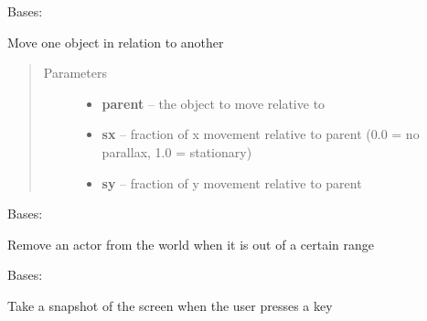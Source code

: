 \documentclass[letterpaper,10pt,english]{sphinxmanual}
\begin{document}
\begin{fulllineitems}
\label{blocks:serge.blocks.behaviours.ParallaxMotion}
Bases: {\hyperref[blocks:serge.blocks.behaviours.Behaviour]{}}

Move one object in relation to another
\begin{quote}\begin{description}
\item[{Parameters}] \leavevmode\begin{itemize}
\item {} 
\textbf{parent} -- the object to move relative to

\item {} 
\textbf{sx} -- fraction of x movement relative to parent (0.0 = no parallax, 1.0 = stationary)

\item {} 
\textbf{sy} -- fraction of y movement relative to parent

\end{itemize}

\end{description}\end{quote}

\end{fulllineitems}


\begin{fulllineitems}
\label{blocks:serge.blocks.behaviours.RemoveWhenOutOfRange}
Bases: {\hyperref[blocks:serge.blocks.behaviours.Behaviour]{}}

Remove an actor from the world when it is out of a certain range

\end{fulllineitems}


\begin{fulllineitems}
\label{blocks:serge.blocks.behaviours.SnapshotOnKey}
Bases: {\hyperref[blocks:serge.blocks.behaviours.Behaviour]{}}

Take a snapshot of the screen when the user presses a key

\end{fulllineitems}
\end{document}
